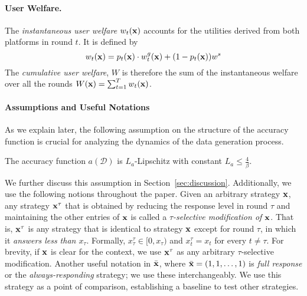 \paragraph{User Welfare.}  
The \textit{instantaneous user welfare} $w_t({\bf{x}})$ accounts for the utilities derived from both platforms in round $t$. It is defined by
\begin{equation}\label{eq:def inst}
w_t({\bf{x}}) = p_t(\mathbf{x}) \cdot w^g_t(\mathbf{x}) + (1 - p_t(\mathbf{x})) w^s    
\end{equation}
The \textit{cumulative user welfare}, $W$ is therefore the sum of the instantaneous welfare over all the rounds $W({\bf{x}}) = \sum_{t = 1}^T w_t({\bf{x}})$.



\paragraph{Assumptions and Useful Notations}
As we explain later, the following assumption on the structure of the accuracy function is crucial for analyzing the dynamics of the data generation process.
\begin{assumption} \label{assumption: data lip}
The accuracy function $a(\mathcal{D})$ is $L_a$-Lipschitz with constant $L_a \leq \frac{4}{\beta}$. 
\end{assumption}
We further discuss this assumption in Section~\ref{sec:discussion}. Additionally, we use the following notions throughout the paper. Given an arbitrary strategy ${\bf{x}}$, any strategy ${\bf{x}}^\tau$ that is obtained by reducing the response level in round $\tau$ and maintaining the other entries of ${\bf{x}}$ is called a \emph{$\tau$-selective modification of ${\bf{x}}$}. That is,  ${\bf{x}}^\tau$ is any strategy that is identical to strategy ${\bf{x}}$ except for round $\tau$, in which it \emph{answers less than $x_\tau$}. Formally, $x^\tau_{\tau} \in [0, x_{\tau})$ and $x^\tau_t = x_t$ for every $t \neq \tau$. For brevity, if ${\bf{x}}$ is clear for the context, we use ${\bf{x}}^\tau$ as any arbitrary $\tau$-selective modification. Another useful notation in $\Bar{{\bf{x}}}$, where $\Bar{{\bf{x}}} = (1, 1, \dots, 1)$ is \emph{full response} or the \emph{always-responding} strategy; we use these interchangeably. We use this strategy as a point of comparison, establishing a baseline to test other strategies.
